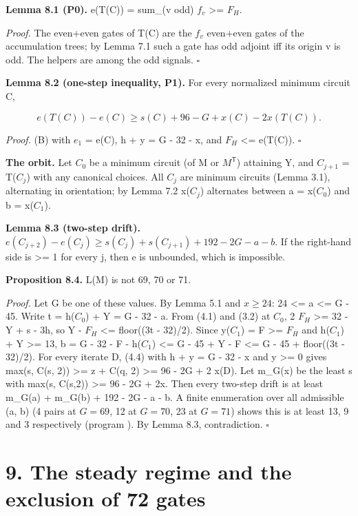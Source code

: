 \textbf{Lemma 8.1 (P0).} e(T(C)) = sum\_(v odd) \(f_v\) \textgreater= \(F_H\).

\emph{Proof.} The even+even gates of T(C) are the \(f_v\) even+even gates of the accumulation trees; by Lemma 7.1 such a gate has odd adjoint iff its origin v is odd. The helpers are among the odd signals. \(\square\)

\textbf{Lemma 8.2 (one-step inequality, P1).} For every normalized minimum circuit C,

\[
e(T(C))-e(C)\ge s(C)+96-G+x(C)-2x(T(C)).
\]

\emph{Proof.} (B) with \(e_1\) = e(C), h + y = G - 32 - x, and \(F_H\) \textless= e(T(C)). \(\square\)

\textbf{The orbit.} Let \(C_0\) be a minimum circuit (of M or \(M^{\mathsf T}\)) attaining Y, and \(C_{j+1}\) = T(\(C_j\)) with any canonical choices. All \(C_j\) are minimum circuits (Lemma 3.1), alternating in orientation; by Lemma 7.2 x(\(C_j\)) alternates between a = x(\(C_0\)) and b = x(\(C_1\)).

\textbf{Lemma 8.3 (two-step drift).} \(e(C_{j+2})-e(C_j)\ge s(C_j)+s(C_{j+1})+192-2G-a-b\). If the right-hand side is \textgreater= 1 for every j, then e is unbounded, which is impossible.

\textbf{Proposition 8.4.} L(M) is not 69, 70 or 71.

\emph{Proof.} Let G be one of these values. By Lemma 5.1 and \(x\ge24\): 24 \textless= a \textless= G - 45. Write t = h(\(C_0\)) + Y = G - 32 - a. From (4.1) and (3.2) at \(C_0\), 2 \(F_H\) \textgreater= 32 - Y + s - 3h, so Y - \(F_H\) \textless= floor((3t - 32)/2). Since y(\(C_1\)) = F \textgreater= \(F_H\) and h(\(C_1\)) + Y \textgreater= 13, b = G - 32 - F - h(\(C_1\)) \textless= G - 45 + Y - F \textless= G - 45 + floor((3t - 32)/2). For every iterate D, (4.4) with h + y = G - 32 - x and y \textgreater= 0 gives max(s, C(s, 2)) \textgreater= z + C(q, 2) \textgreater= 96 - 2G + 2 x(D). Let m\_G(x) be the least s with max(s, C(s,2)) \textgreater= 96 - 2G + 2x. Then every two-step drift is at least m\_G(a) + m\_G(b) + 192 - 2G - a - b. A finite enumeration over all admissible (a, b) (4 pairs at \(G=69\), 12 at \(G=70\), 23 at \(G=71\)) shows this is at least 13, 9 and 3 respectively (program \texttt{}). By Lemma 8.3, contradiction. \(\square\)

\hypertarget{the-steady-regime-and-the-exclusion-of-72-gates}{%
\section{9. The steady regime and the exclusion of 72 gates}\label{the-steady-regime-and-the-exclusion-of-72-gates}}

